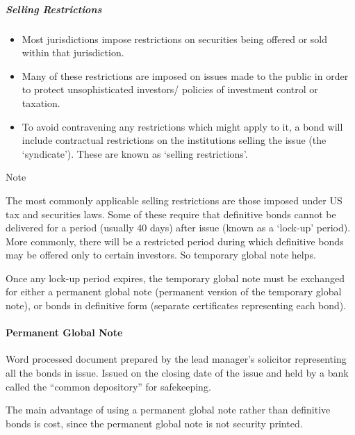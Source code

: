 \documentclass[
]{article}
\providecommand{\tightlist}{%
  \setlength{\itemsep}{0pt}\setlength{\parskip}{0pt}}
\newenvironment{env-9f1ad080-32f6-4f2b-8995-b682d7bd2848}
{
    \savenotes\tcolorbox[blanker,breakable,left=5pt,borderline west={2pt}{-4pt}{blue}]
}
{
    \endtcolorbox\spewnotes
}
\begin{document}
\hypertarget{selling-restrictions}{%
\subparagraph{Selling Restrictions}\label{selling-restrictions}}

\begin{itemize}
\tightlist
\item
  Most jurisdictions impose restrictions on securities being offered or
  sold within that jurisdiction.
\item
  Many of these restrictions are imposed on issues made to the public in
  order to protect unsophisticated investors/ policies of investment
  control or taxation.
\item
  To avoid contravening any restrictions which might apply to it, a bond
  will include contractual restrictions on the institutions selling the
  issue (the `syndicate'). These are known as `selling restrictions'.
\end{itemize}

\begin{env-9f1ad080-32f6-4f2b-8995-b682d7bd2848}

Note

The most commonly applicable selling restrictions are those imposed
under US tax and securities laws. Some of these require that definitive
bonds cannot be delivered for a period (usually 40 days) after issue
(known as a `lock-up' period). More commonly, there will be a restricted
period during which definitive bonds may be offered only to certain
investors. So temporary global note helps.

\end{env-9f1ad080-32f6-4f2b-8995-b682d7bd2848}

Once any lock-up period expires, the temporary global note must be
exchanged for either a permanent global note (permanent version of the
temporary global note), or bonds in definitive form (separate
certificates representing each bond).

\hypertarget{permanent-global-note}{%
\paragraph{Permanent Global Note}\label{permanent-global-note}}

Word processed document prepared by the lead manager's solicitor
representing all the bonds in issue. Issued on the closing date of the
issue and held by a bank called the ``common depository'' for
safekeeping.

The main advantage of using a permanent global note rather than
definitive bonds is cost, since the permanent global note is not
security printed.
\end{document}
